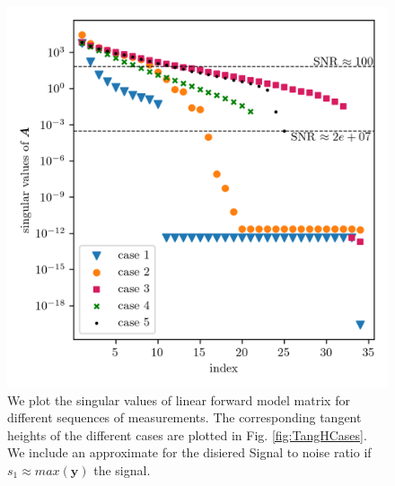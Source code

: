 \begin{figure}[ht!]
	\centering
	\includegraphics{SingValA.png}
	\caption[Singular values of linear forward model matrix for different sequences of measurements.]{We plot the singular values of linear forward model matrix for different sequences of measurements.
	The corresponding tangent heights of the different cases are plotted in Fig. \ref{fig:TangHCases}. We include an approximate for the disiered Signal to noise ratio if $s_1 \approx max(\bm{y}) $ the signal.}
	\label{fig:SingA}
\end{figure}


